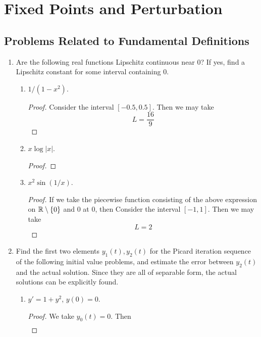 \documentclass[../psets.tex]{subfiles}
\begin{document}
\section{Fixed Points and Perturbation}
\subsection*{Problems Related to Fundamental Definitions}
\begin{enumerate}
    \item {}Are the following real functions Lipschitz continuous near 0? If yes, find a Lipschitz constant for some interval containing 0.
    \begin{enumerate}
        \item $1/(1-x^2)$.
        \begin{proof}
             Consider the interval $[-0.5,0.5]$. Then we may take
            \begin{equation*}
                \boxed{L = \frac{16}{9}}
            \end{equation*}
        \end{proof}
        \item $x\log|x|$.
        \begin{proof}
        \end{proof}
        \item $x^2\sin(1/x)$.
        \begin{proof}
            If we take the piecewise function consisting of the above expression on $\mathbb{R}\setminus\{0\}$ and 0 at 0, then  Consider the interval $[-1,1]$. Then we may take
            \begin{equation*}
                \boxed{L = 2}
            \end{equation*}
        \end{proof}
    \end{enumerate}
    \item Find the first two elements $y_1(t),y_2(t)$ for the Picard iteration sequence of the following initial value problems, and estimate the error between $y_2(t)$ and the actual solution. Since they are all of separable form, the actual solutions can be explicitly found.
    \begin{enumerate}
        \item $y'=1+y^2$, $y(0)=0$.
        \begin{proof}
            We take $y_0(t)=0$. Then
            \begin{align*}

\end{align*}
\end{proof}
\end{enumerate}
\end{enumerate}
\end{document}
